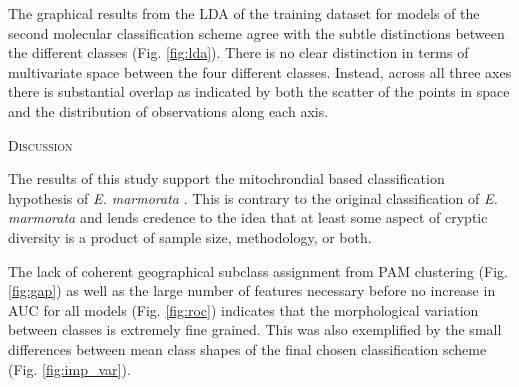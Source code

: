 \documentclass[12pt,letterpaper]{article}\usepackage{graphicx, color}
\renewcommand{\section}[1]{%
\bigskip
\begin{center}
\begin{Large}
\normalfont\scshape #1
\medskip
\end{Large}
\end{center}}
\begin{document}
The graphical results from the LDA of the training dataset for models of the second molecular classification scheme agree with the subtle distinctions between the different classes (Fig. \ref{fig:lda}). There is no clear distinction in terms of multivariate space between the four different classes. Instead, across all three axes there is substantial overlap as indicated by both the scatter of the points in space and the distribution of observations along each axis.

\section{Discussion}
The results of this study support the mitochrondial based classification hypothesis of \textit{E. marmorata} \citep{Spinks2005,Spinks2010}. This is contrary to the original classification of \textit{E. marmorata} \citep{Seeliger1945,Holland1992} and lends credence to the idea that at least some aspect of cryptic diversity is a product of sample size, methodology, or both.


The lack of coherent geographical subclass assignment from PAM clustering (Fig. \ref{fig:gap}) as well as the large number of features necessary before no increase in AUC for all models (Fig. \ref{fig:roc}) indicates that the morphological variation between classes is extremely fine grained. This was also exemplified by the small differences between mean class shapes of the final chosen classification scheme (Fig. \ref{fig:imp_var}).
\end{document}
